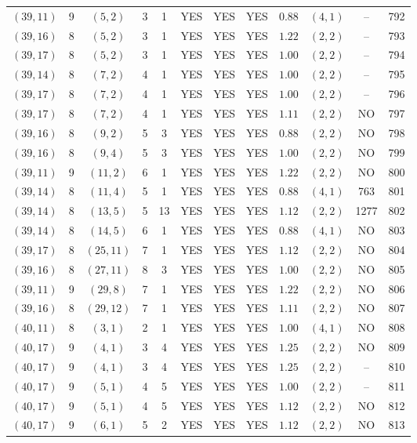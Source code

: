 \begin{longtable}{|c|c|c|c|c|c|c|c|c|c|c|c|}
$(39,11)$ & 9 & $(5,2)$ & 3 & 1 & YES & YES & YES & $0.88$ & $(4,1)$ & -- & 792\\
$(39,16)$ & 8 & $(5,2)$ & 3 & 1 & YES & YES & YES & $1.22$ & $(2,2)$ & -- & 793\\
$(39,17)$ & 8 & $(5,2)$ & 3 & 1 & YES & YES & YES & $1.00$ & $(2,2)$ & -- & 794\\
$(39,14)$ & 8 & $(7,2)$ & 4 & 1 & YES & YES & YES & $1.00$ & $(2,2)$ & -- & 795\\
$(39,17)$ & 8 & $(7,2)$ & 4 & 1 & YES & YES & YES & $1.00$ & $(2,2)$ & -- & 796\\
$(39,17)$ & 8 & $(7,2)$ & 4 & 1 & YES & YES & YES & $1.11$ & $(2,2)$ & NO & 797\\
$(39,16)$ & 8 & $(9,2)$ & 5 & 3 & YES & YES & YES & $0.88$ & $(2,2)$ & NO & 798\\
$(39,16)$ & 8 & $(9,4)$ & 5 & 3 & YES & YES & YES & $1.00$ & $(2,2)$ & NO & 799\\
$(39,11)$ & 9 & $(11,2)$ & 6 & 1 & YES & YES & YES & $1.22$ & $(2,2)$ & NO & 800\\
$(39,14)$ & 8 & $(11,4)$ & 5 & 1 & YES & YES & YES & $0.88$ & $(4,1)$ & 763 & 801\\
$(39,14)$ & 8 & $(13,5)$ & 5 & 13 & YES & YES & YES & $1.12$ & $(2,2)$ & 1277 & 802\\
$(39,14)$ & 8 & $(14,5)$ & 6 & 1 & YES & YES & YES & $0.88$ & $(4,1)$ & NO & 803\\
$(39,17)$ & 8 & $(25,11)$ & 7 & 1 & YES & YES & YES & $1.12$ & $(2,2)$ & NO & 804\\
$(39,16)$ & 8 & $(27,11)$ & 8 & 3 & YES & YES & YES & $1.00$ & $(2,2)$ & NO & 805\\
$(39,11)$ & 9 & $(29,8)$ & 7 & 1 & YES & YES & YES & $1.22$ & $(2,2)$ & NO & 806\\
$(39,16)$ & 8 & $(29,12)$ & 7 & 1 & YES & YES & YES & $1.11$ & $(2,2)$ & NO & 807\\
$(40,11)$ & 8 & $(3,1)$ & 2 & 1 & YES & YES & YES & $1.00$ & $(4,1)$ & NO & 808\\
$(40,17)$ & 9 & $(4,1)$ & 3 & 4 & YES & YES & YES & $1.25$ & $(2,2)$ & NO & 809\\
$(40,17)$ & 9 & $(4,1)$ & 3 & 4 & YES & YES & YES & $1.25$ & $(2,2)$ & -- & 810\\
$(40,17)$ & 9 & $(5,1)$ & 4 & 5 & YES & YES & YES & $1.00$ & $(2,2)$ & -- & 811\\
$(40,17)$ & 9 & $(5,1)$ & 4 & 5 & YES & YES & YES & $1.12$ & $(2,2)$ & NO & 812\\
$(40,17)$ & 9 & $(6,1)$ & 5 & 2 & YES & YES & YES & $1.12$ & $(2,2)$ & NO & 813\\

\end{longtable}
